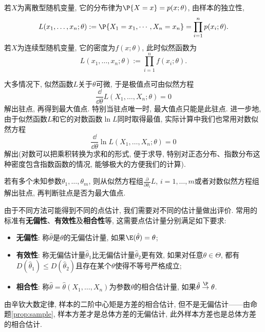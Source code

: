 \documentclass[11pt]{ctexart}
\begin{document}
\noindent
若$X$为离散型随机变量, 它的分布律为$\P\{X = x\} = p(x; \theta)$, 由样本的独立性, 
\begin{equation*}
	L(x_1, \dots, x_n; \theta) 
	:= \P\{X_1 = x_1, \cdots, X_n = x_n\}
	= \prod_{i=1}^n p(x_i; \theta). 
\end{equation*}
若$X$为连续型随机变量, 它的密度为$f(x;\theta)$, 此时似然函数为
\begin{equation*}
	L(x_1, \dots, x_n; \theta) 
	:= \prod_{i=1}^n f(x_i; \theta).
\end{equation*}

\begin{remark}
	大多情况下, 似然函数$L$关于$\theta$可微, 于是极值点可由似然方程
	\begin{equation*}
		\frac{\dd}{\dd \theta} L(X_1, \dots, X_n; \theta) = 0
	\end{equation*}
	解出驻点, 再得到最大值点.
	特别当驻点唯一时, 最大值点只能是此驻点. 
	进一步地, 由于似然函数$L$和它的对数函数$\ln L$同时取得最值, 实际计算中我们也常用对数似然方程
	\begin{equation*}
		\frac{\dd}{\dd \theta} \ln L(X_1, \dots, X_n; \theta) = 0
	\end{equation*}
	解出(对数可以把乘积转换为求和的形式, 便于求导, 特别对正态分布、指数分布这种密度包含指数函数的情况, 能够极大的方便我们的计算). 
\end{remark}

若有多个未知参数$\theta_1, \dots, \theta_m$, 则从似然方程组$\frac{\partial}{\partial \theta_i} L$, $i = 1, \dots, m$或者对数似然方程组解出驻点, 再判断驻点是否为最大值点. 


由于不同方法可能得到不同的点估计, 我们需要对不同的估计量做出评价. 
常用的标准有\textbf{无偏性}、\textbf{有效性}及\textbf{相合性}等, 这需要点估计量分别满足如下要求: 
\begin{itemize}
	\item \textbf{无偏性}: 称$\hat \theta$是$\theta$的无偏估计量, 如果$\E(\hat \theta) = \theta$; 
	\item \textbf{有效性}: 称无偏估计量$\hat \theta_1$比无偏估计量$\hat \theta_2$更有效, 如果对任意$\theta \in \Theta$, 都有$D(\hat \theta_1) \leq D(\hat \theta_2)$且存在某个$\theta$使得不等号严格成立; 
	\item \textbf{相合性}: 称$\hat \theta = \hat \theta(X_1, \dots, X_n)$为参数$\theta$的相合估计量, 如果$\hat \theta \stackrel{\P}{\to} \theta$. 
\end{itemize}
\begin{remark}
	由辛钦大数定律, 样本的二阶中心矩是方差的相合估计, 但不是无偏估计——由命题\ref{prop:sample}, 样本方差才是总体方差的无偏估计, 此外样本方差也是总体方差的相合估计. 
\end{remark}
\end{document}
